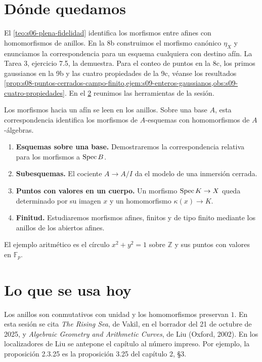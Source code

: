 \section{Dónde quedamos}
\label{sec:s10-donde-quedamos}

El \cref{teo:s06-plena-fidelidad} identifica los morfismos entre afines con homomorfismos de anillos. En la 8b construimos el morfismo canónico \(\eta_X\) y enunciamos la correspondencia para un esquema cualquiera con destino afín. La Tarea 3, ejercicio 7.5, la demuestra. Para el conteo de puntos en la 8c, los primos gaussianos en la 9b y las cuatro propiedades de la 9c, véanse los resultados \cref{prop:s08-puntos-cerrados-campo-finito,ejem:s09-enteros-gaussianos,obs:s09-cuatro-propiedades}. En el \cref{sec:s10-antecedentes} reunimos las herramientas de la sesión.

\begin{obs}
\label{obs:s10-objetivos}
Los morfismos hacia un afín se leen en los anillos. Sobre una base \(A\), esta correspondencia identifica los morfismos de \(A\)-esquemas con homomorfismos de \(A\)-álgebras.
\begin{enumerate}
\item \textbf{Esquemas sobre una base.} Demostraremos la correspondencia relativa para los morfismos a \(\operatorname{Spec} B\).
\item \textbf{Subesquemas.} El cociente \(A\to A/I\) da el modelo de una inmersión cerrada.
\item \textbf{Puntos con valores en un cuerpo.} Un morfismo \(\operatorname{Spec} K\to X\) queda determinado por su imagen \(x\) y un homomorfismo \(\kappa(x)\to K\).
\item \textbf{Finitud.} Estudiaremos morfismos afines, finitos y de tipo finito mediante los anillos de los abiertos afines.
\end{enumerate}
El ejemplo aritmético es el círculo \(x^2+y^2=1\) sobre \(\mathbb Z\) y sus puntos con valores en \(\mathbb F_p\).
\end{obs}

\section{Lo que se usa hoy}
\label{sec:s10-antecedentes}

Los anillos son conmutativos con unidad y los homomorfismos preservan \(1\). En esta sesión se cita \emph{The Rising Sea}, de Vakil, en el borrador del 21 de octubre de 2025, y \emph{Algebraic Geometry and Arithmetic Curves}, de Liu (Oxford, 2002). En los localizadores de Liu se antepone el capítulo al número impreso. Por ejemplo, la proposición 2.3.25 es la proposición 3.25 del capítulo 2, \S3.

